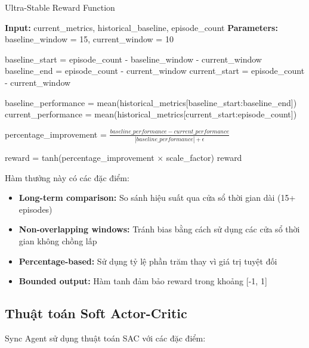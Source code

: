 \begin{algorithm}[!htp]
    \caption{Ultra-Stable Reward Function}
    \begin{algorithmic}[1]
        \State \textbf{Input:} current\_metrics, historical\_baseline, episode\_count 
        \State \textbf{Parameters:} baseline\_window = 15, current\_window = 10 
             
        \EndIf
        
        \State baseline\_start = episode\_count - baseline\_window - current\_window
        \State baseline\_end = episode\_count - current\_window
        \State current\_start = episode\_count - current\_window
        
        \State baseline\_performance = mean(historical\_metrics[baseline\_start:baseline\_end])
        \State current\_performance = mean(historical\_metrics[current\_start:episode\_count])
        
        \State percentage\_improvement = $\frac{baseline\_performance - current\_performance}{|baseline\_performance| + \epsilon}$
        
        \State reward = tanh(percentage\_improvement $\times$ scale\_factor)
        \Return reward
    \end{algorithmic}
\end{algorithm}

Hàm thưởng này có các đặc điểm:
\begin{itemize}
    \item \textbf{Long-term comparison:} So sánh hiệu suất qua cửa sổ thời gian
        dài (15+ episodes)

    \item \textbf{Non-overlapping windows:} Tránh bias bằng cách sử dụng các cửa
        sổ thời gian không chồng lấp

    \item \textbf{Percentage-based:} Sử dụng tỷ lệ phần trăm thay vì giá trị
        tuyệt đối

    \item \textbf{Bounded output:} Hàm tanh đảm bảo reward trong khoảng [-1, 1]
\end{itemize}

\subsection{Thuật toán Soft Actor-Critic}
Sync Agent sử dụng thuật toán SAC với các đặc điểm:

